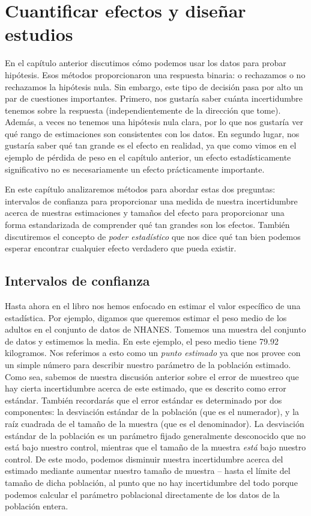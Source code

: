 \documentclass[
  12pt,
]{book}
\theoremstyle{definition}
\theoremstyle{definition}
\theoremstyle{definition}
\theoremstyle{remark}
\begin{document}
\hypertarget{ci-effect-size-power}{%
\chapter{Cuantificar efectos y diseñar estudios}\label{ci-effect-size-power}}

En el capítulo anterior discutimos cómo podemos usar los datos para probar hipótesis. Esos métodos proporcionaron una respuesta binaria: o rechazamos o no rechazamos la hipótesis nula. Sin embargo, este tipo de decisión pasa por alto un par de cuestiones importantes. Primero, nos gustaría saber cuánta incertidumbre tenemos sobre la respuesta (independientemente de la dirección que tome). Además, a veces no tenemos una hipótesis nula clara, por lo que nos gustaría ver qué rango de estimaciones son consistentes con los datos. En segundo lugar, nos gustaría saber qué tan grande es el efecto en realidad, ya que como vimos en el ejemplo de pérdida de peso en el capítulo anterior, un efecto estadísticamente significativo no es necesariamente un efecto prácticamente importante.

En este capítulo analizaremos métodos para abordar estas dos preguntas: intervalos de confianza para proporcionar una medida de nuestra incertidumbre acerca de nuestras estimaciones y tamaños del efecto para proporcionar una forma estandarizada de comprender qué tan grandes son los efectos. También discutiremos el concepto de \emph{poder estadístico} que nos dice qué tan bien podemos esperar encontrar cualquier efecto verdadero que pueda existir.

\hypertarget{intervalos-de-confianza}{%
\section{Intervalos de confianza}\label{intervalos-de-confianza}}

Hasta ahora en el libro nos hemos enfocado en estimar el valor específico de una estadística. Por ejemplo, digamos que queremos estimar el peso medio de los adultos en el conjunto de datos de NHANES. Tomemos una muestra del conjunto de datos y estimemos la media. En este ejemplo, el peso medio tiene 79.92 kilogramos. Nos referimos a esto como un \emph{punto estimado} ya que nos provee con un simple número para describir nuestro parámetro de la población estimado. Como sea, sabemos de nuestra discusión anterior sobre el error de muestreo que hay cierta incertidumbre acerca de este estimado, que es descrito como error estándar. También recordarás que el error estándar es determinado por dos componentes: la desviación estándar de la población (que es el numerador), y la raíz cuadrada de el tamaño de la muestra (que es el denominador). La desviación estándar de la población es un parámetro fijado generalmente desconocido que no está bajo nuestro control, mientras que el tamaño de la muestra \emph{está} bajo nuestro control. De este modo, podemos disminuir nuestra incertidumbre acerca del estimado mediante aumentar nuestro tamaño de muestra -- hasta el límite del tamaño de dicha población, al punto que no hay incertidumbre del todo porque podemos calcular el parámetro poblacional directamente de los datos de la población entera.
\end{document}

